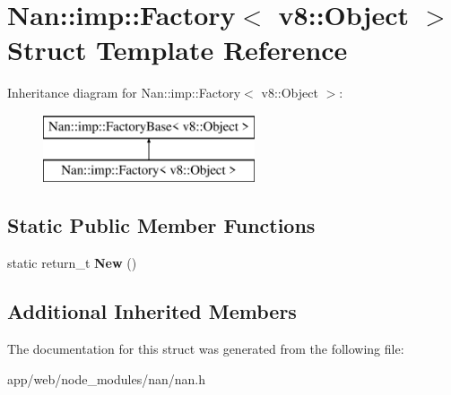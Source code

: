 \hypertarget{struct_nan_1_1imp_1_1_factory_3_01v8_1_1_object_01_4}{}\section{Nan\+:\+:imp\+:\+:Factory$<$ v8\+:\+:Object $>$ Struct Template Reference}
\label{struct_nan_1_1imp_1_1_factory_3_01v8_1_1_object_01_4}
Inheritance diagram for Nan\+:\+:imp\+:\+:Factory$<$ v8\+:\+:Object $>$\+:\begin{figure}[H]
\begin{center}
\leavevmode
\includegraphics[height=2.000000cm]{struct_nan_1_1imp_1_1_factory_3_01v8_1_1_object_01_4}
\end{center}
\end{figure}
\subsection*{Static Public Member Functions}
\begin{DoxyCompactItemize}
\item 
\mbox{\label{struct_nan_1_1imp_1_1_factory_3_01v8_1_1_object_01_4_acad522160c40e53250c526a7888966ad}} 
static return\+\_\+t {\bfseries New} ()
\end{DoxyCompactItemize}
\subsection*{Additional Inherited Members}


The documentation for this struct was generated from the following file\+:\begin{DoxyCompactItemize}
\item 
app/web/node\+\_\+modules/nan/nan.\+h\end{DoxyCompactItemize}
